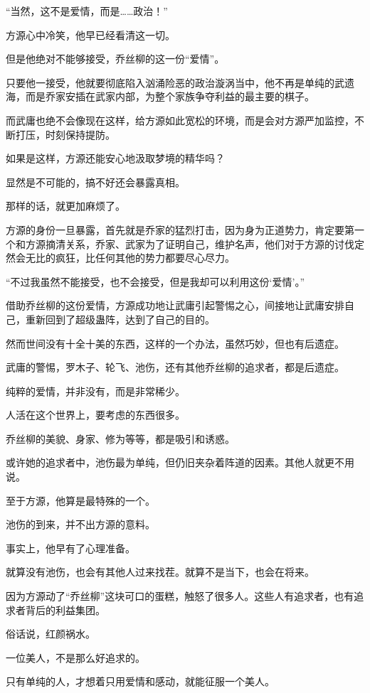 \begin{this_body}
“当然，这不是爱情，而是……政治！”

方源心中冷笑，他早已经看清这一切。

但是他绝对不能够接受，乔丝柳的这一份“爱情”。

只要他一接受，他就要彻底陷入汹涌险恶的政治漩涡当中，他不再是单纯的武遗海，而是乔家安插在武家内部，为整个家族争夺利益的最主要的棋子。

而武庸也绝不会像现在这样，给方源如此宽松的环境，而是会对方源严加监控，不断打压，时刻保持提防。

如果是这样，方源还能安心地汲取梦境的精华吗？

显然是不可能的，搞不好还会暴露真相。

那样的话，就更加麻烦了。

方源的身份一旦暴露，首先就是乔家的猛烈打击，因为身为正道势力，肯定要第一个和方源摘清关系，乔家、武家为了证明自己，维护名声，他们对于方源的讨伐定然会无比的疯狂，比任何其他的势力都要尽心尽力。

“不过我虽然不能接受，也不会接受，但是我却可以利用这份‘爱情’。”

借助乔丝柳的这份爱情，方源成功地让武庸引起警惕之心，间接地让武庸安排自己，重新回到了超级蛊阵，达到了自己的目的。

然而世间没有十全十美的东西，这样的一个办法，虽然巧妙，但也有后遗症。

武庸的警惕，罗木子、轮飞、池伤，还有其他乔丝柳的追求者，都是后遗症。

纯粹的爱情，并非没有，而是非常稀少。

人活在这个世界上，要考虑的东西很多。

乔丝柳的美貌、身家、修为等等，都是吸引和诱惑。

或许她的追求者中，池伤最为单纯，但仍旧夹杂着阵道的因素。其他人就更不用说。

至于方源，他算是最特殊的一个。

池伤的到来，并不出方源的意料。

事实上，他早有了心理准备。

就算没有池伤，也会有其他人过来找茬。就算不是当下，也会在将来。

因为方源动了“乔丝柳”这块可口的蛋糕，触怒了很多人。这些人有追求者，也有追求者背后的利益集团。

俗话说，红颜祸水。

一位美人，不是那么好追求的。

只有单纯的人，才想着只用爱情和感动，就能征服一个美人。


\end{this_body}
